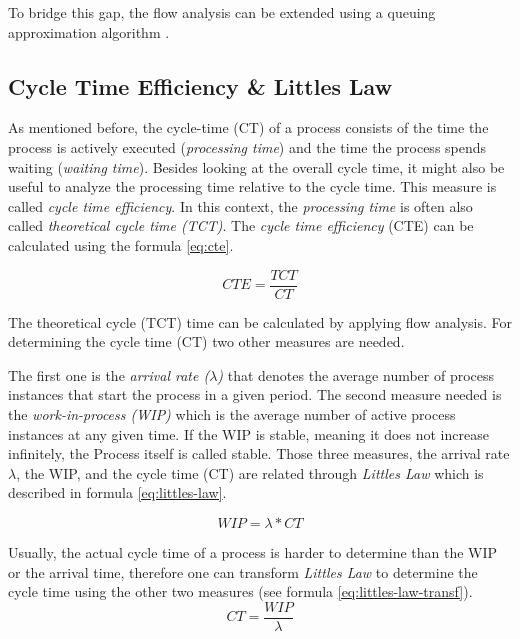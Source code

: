 To bridge this gap, the flow analysis can be extended using a queuing approximation algorithm \cite{ha2006approximate}.


\subsection{Cycle Time Efficiency \& Littles Law}
As mentioned before, the \gls{cycle-time} (CT) of a process consists of the time the process is actively executed (\textit{processing time}) and the time the process spends waiting (\textit{waiting time}). Besides looking at the overall cycle time, it might also be useful to analyze the processing time relative to the cycle time. This measure is called \textit{cycle time efficiency}. In this context, the \textit{processing time} is often also called \textit{theoretical cycle time (TCT)}. The \textit{cycle time efficiency} (CTE) can be calculated using the formula \ref{eq:cte}.\cite{fundamentals}

\begin{equation}\label{eq:cte}
	CTE = \dfrac{TCT}{CT}
\end{equation}

The theoretical cycle (TCT) time can be calculated by applying flow analysis. For determining the cycle time (CT) two other measures are needed. 

The first one is the \textit{arrival rate ($\lambda$)} that denotes the average number of process instances that start the process in a given period. The second measure needed is the \textit{work-in-process (WIP)} which is the average number of active process instances at any given time. If the WIP is stable, meaning it does not increase infinitely, the Process itself is called stable. Those three measures, the arrival rate $\lambda$, the WIP, and the cycle time (CT) are related through \textit{Littles Law} which is described in formula \ref{eq:littles-law}.\cite{little2008little}

\begin{equation}\label{eq:littles-law}
	WIP = \lambda * CT
\end{equation}

Usually, the actual cycle time of a process is harder to determine than the WIP or the arrival time, therefore one can transform \textit{Littles Law} to determine the cycle time using the other two measures (see formula \ref{eq:littles-law-transf}).
\begin{equation}\label{eq:littles-law-transf}
	CT = \dfrac{WIP}{\lambda}
\end{equation}